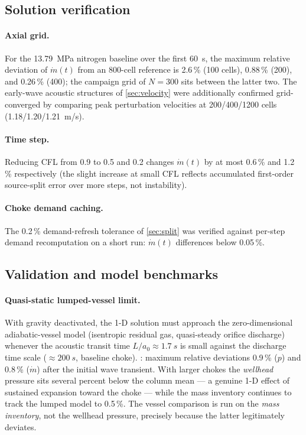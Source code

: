 \documentclass[11pt]{article}
\newcommand{\mdot}{\dot{m}}
\begin{document}
\subsection{Solution verification}
\label{sec:vv-solution}

\paragraph{Axial grid.} For the \SI{13.79}{MPa} nitrogen baseline over
the first \SI{60}{s}, the maximum relative deviation of $\mdot(t)$
from an 800-cell reference is 2.6\,\% (100 cells), 0.88\,\% (200), and
0.26\,\% (400); the campaign grid of $N=300$ sits between the latter
two. The early-wave acoustic structures of \cref{sec:velocity} were
additionally confirmed grid-converged by comparing peak perturbation
velocities at 200/400/1200 cells (1.18/1.20/\SI{1.21}{m/s}).

\paragraph{Time step.} Reducing CFL from 0.9 to 0.5 and 0.2 changes
$\mdot(t)$ by at most 0.6\,\% and 1.2\,\% respectively (the slight
increase at small CFL reflects accumulated first-order source-split
error over more steps, not instability).

\paragraph{Choke demand caching.} The 0.2\,\% demand-refresh
tolerance of \cref{sec:split} was verified against per-step demand
recomputation on a short run: $\mdot(t)$ differences below 0.05\,\%.

\subsection{Validation and model benchmarks}
\label{sec:vv-model}

\paragraph{Quasi-static lumped-vessel limit.} With gravity
deactivated, the 1-D solution must approach the zero-dimensional
adiabatic-vessel model (isentropic residual gas, quasi-steady orifice
discharge) whenever the acoustic transit time $L/a_0 \approx
\SI{1.7}{s}$ is small against the discharge time scale
($\approx\SI{200}{s}$, baseline choke). : maximum
relative deviations 0.9\,\% ($p$) and 0.8\,\% ($\mdot$) after the
initial wave transient. With larger chokes the \emph{wellhead}
pressure sits several percent below the column mean --- a genuine 1-D
effect of sustained expansion toward the choke --- while the mass
inventory continues to track the lumped model to 0.5\,\%. The
vessel comparison is run on the \emph{mass inventory}, not the
wellhead pressure, precisely because the latter legitimately deviates.
\end{document}
